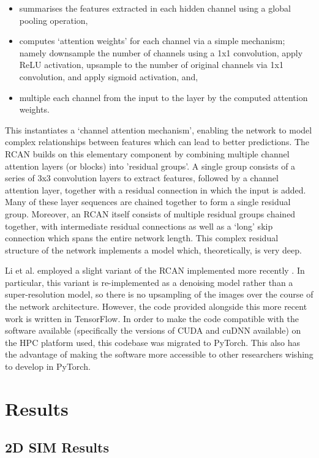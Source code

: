 \documentclass[12pt]{article}
\begin{document}
\begin{itemize}
    \item summarises the features extracted in each hidden channel using a global pooling operation,
    \item computes `attention weights' for each channel via a simple mechanism;
    namely downsample the number of channels using a 1x1 convolution,
    apply ReLU activation,
    upsample to the number of original channels via 1x1 convolution,
    and apply sigmoid activation, and,
    \item multiple each channel from the input to the layer by the computed attention weights.
\end{itemize}

This instantiates a `channel attention mechanism', enabling the network to model complex relationships between features which can lead to better predictions.
The RCAN builds on this elementary component by combining multiple channel attention layers (or blocks) into 'residual groups'.
A single group consists of a series of 3x3 convolution layers to extract features,
followed by a channel attention layer, together with a residual connection in which the input is added.
Many of these layer sequences are chained together to form a single residual group.
Moreover, an RCAN itself consists of multiple residual groups chained together,
with intermediate residual connections as well as a `long' skip connection which spans the entire network length.
This complex residual structure of the network implements a model which, theoretically, is very deep.

Li et al. employed a slight variant of the RCAN implemented more recently \cite{rcan2021}.
In particular, this variant is re-implemented as a denoising model rather than a super-resolution model,
so there is no upsampling of the images over the course of the network architecture.
However, the code provided alongside this more recent work is written in TensorFlow.
In order to make the code compatible with the software available (specifically the versions of CUDA and cuDNN available) on the HPC platform used,
this codebase was migrated to PyTorch.
This also has the advantage of making the software more accessible to other researchers wishing to develop in PyTorch.

\section{Results}

\subsection{2D SIM Results}
\end{document}
